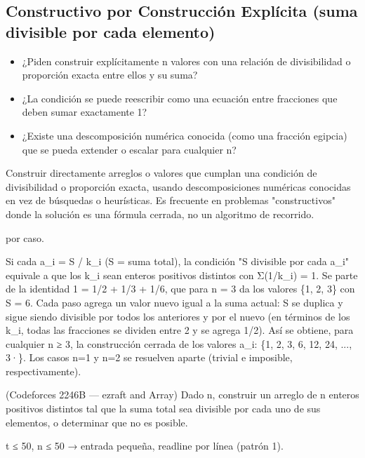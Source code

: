 \subsection{Constructivo por Construcción Explícita (suma divisible por cada elemento)}
\label{alg:8-2}


\begin{itemize}
\item ¿Piden construir explícitamente n valores con una relación de divisibilidad o proporción exacta entre ellos y su suma?
\item ¿La condición se puede reescribir como una ecuación entre fracciones que deben sumar exactamente 1?
\item ¿Existe una descomposición numérica conocida (como una fracción egipcia) que se pueda extender o escalar para cualquier n?
\end{itemize}

 Construir directamente arreglos o valores que cumplan una condición de divisibilidad o proporción exacta, usando descomposiciones numéricas conocidas en vez de búsquedas o heurísticas. Es frecuente en problemas "constructivos" donde la solución es una fórmula cerrada, no un algoritmo de recorrido.

  por caso.

 Si cada a\_i = S / k\_i (S = suma total), la condición "S divisible por cada a\_i" equivale a que los k\_i sean enteros positivos distintos con Σ(1/k\_i) = 1. Se parte de la identidad 1 = 1/2 + 1/3 + 1/6, que para n = 3 da los valores \{1, 2, 3\} con S = 6. Cada paso agrega un valor nuevo igual a la suma actual: S se duplica y sigue siendo divisible por todos los anteriores y por el nuevo (en términos de los k\_i, todas las fracciones se dividen entre 2 y se agrega 1/2). Así se obtiene, para cualquier n ≥ 3, la construcción cerrada de los valores a\_i: \{1, 2, 3, 6, 12, 24, ..., 3·\}. Los casos n=1 y n=2 se resuelven aparte (trivial e imposible, respectivamente).


(Codeforces 2246B — ezraft and Array) Dado n, construir un arreglo de n enteros positivos distintos tal que la suma total sea divisible por cada uno de sus elementos, o determinar que no es posible.

 t ≤ 50, n ≤ 50 → entrada pequeña, readline por línea (patrón 1).

